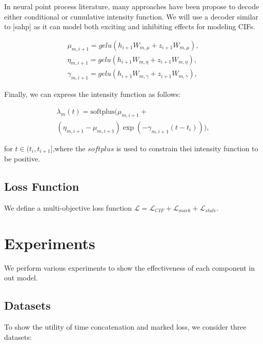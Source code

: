 \documentclass[journal,twoside,web]{ieeecolor}
\begin{document}
In neural point process literature, many approaches have been propose to decode either conditional or cumulative intensity function. We will use a decoder similar to [sahp] as it can model both exciting and inhibiting effects for modeling CIFs.


\begin{gather*} 
    \mu_{m,i+1}=gelu(h_{i+1}W_{m,\mu}  +  z_{i+1}W_{m,\mu}), \\ 
    \eta_{m,i+1}=gelu(h_{i+1}W_{m,\eta}  +  z_{i+1}W_{m,\eta}), \\
    \gamma_{m,i+1}=gelu(h_{i+1}W_{m,\gamma}  +  z_{i+1}W_{m,\gamma}),
    \end{gather*}

Finally, we can express the intensity function as follows:

\begin{multline*}
    \lambda_m(t)=\text{softplus}(\mu_{m,i+1}+\\
    (\eta_{m,i+1}- \mu_{m,i+1}) \exp(-\gamma_{m,i+1}(t-t_i))    ),
\end{multline*}

for $t \in (t_i, t_{i+1}]$,where the $softplus$ is used to constrain thei intensity function to be positive.


\subsection{Loss Function}

We define a multi-objective loss function 
$ \mathcal{L}   =   \mathcal{L}_{CIF}   +   \mathcal{L}_{mark}  +   \mathcal{L}_{state}$.





\section{Experiments}
\label{sec:Experiments}

We perform various experiments to show the effectiveness of each component in out model.
\subsection*{Datasets}


To show the utility of time concatenation and marked loss, we consider three datasets:
\end{document}
